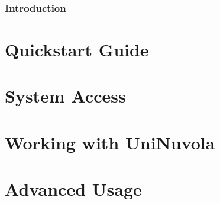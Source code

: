 \documentclass[a4paper,11pt]{article}
\begin{document}


\section*{Introduction}


\pagebreak
\part{Quickstart Guide}


\pagebreak
\part{System Access}

\pagebreak
\part{Working with UniNuvola}

\pagebreak
\part{Advanced Usage}

\end{document}
